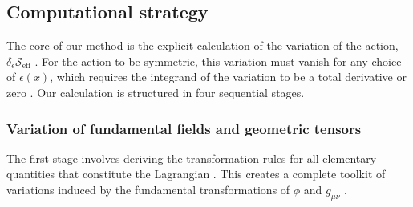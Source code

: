 \documentclass[twocolumn]{aastex631}
\begin{document}
\subsection{Computational strategy}
The core of our method is the explicit calculation of the variation of the action, $\delta_\epsilon \mathcal{S}_{\text{eff}}$  \citep{matsyuk2017inversevariationalproblemsymmetry,lyakhovich2025gaugesymmetrypartiallylagrangian}. For the action to be symmetric, this variation must vanish for any choice of $\epsilon(x)$, which requires the integrand of the variation to be a total derivative or zero  \citep{lyakhovich2025gaugesymmetrypartiallylagrangian}. Our calculation is structured in four sequential stages.
\subsubsection{Variation of fundamental fields and geometric tensors}
The first stage involves deriving the transformation rules for all elementary quantities that constitute the Lagrangian \citep{delcastillo2017symmetriesequationsmotionshared,koay2025generatingparticlephysicslagrangians}. This creates a complete toolkit of variations induced by the fundamental transformations of $\phi$ and $g_{\mu\nu}$ \citep{wagner2021demystifyinglagrangiansspecialrelativity}.
\end{document}
